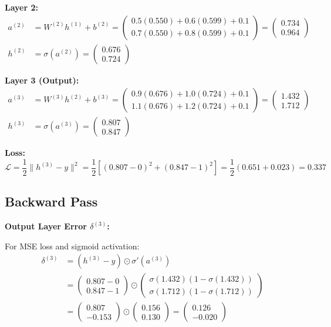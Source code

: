 \textbf{Layer 2:}
\begin{align}
a^{(2)} &= W^{(2)} h^{(1)} + b^{(2)} = \begin{pmatrix} 0.5(0.550) + 0.6(0.599) + 0.1 \\ 0.7(0.550) + 0.8(0.599) + 0.1 \end{pmatrix} = \begin{pmatrix} 0.734 \\ 0.964 \end{pmatrix} \\
h^{(2)} &= \sigma(a^{(2)}) = \begin{pmatrix} 0.676 \\ 0.724 \end{pmatrix}
\end{align}

\textbf{Layer 3 (Output):}
\begin{align}
a^{(3)} &= W^{(3)} h^{(2)} + b^{(3)} = \begin{pmatrix} 0.9(0.676) + 1.0(0.724) + 0.1 \\ 1.1(0.676) + 1.2(0.724) + 0.1 \end{pmatrix} = \begin{pmatrix} 1.432 \\ 1.712 \end{pmatrix} \\
h^{(3)} &= \sigma(a^{(3)}) = \begin{pmatrix} 0.807 \\ 0.847 \end{pmatrix}
\end{align}

\textbf{Loss:}
\[
\mathcal{L} = \frac{1}{2}\|h^{(3)} - y\|^2 = \frac{1}{2}\left[(0.807-0)^2 + (0.847-1)^2\right] = \frac{1}{2}(0.651 + 0.023) = 0.337
\]

\subsection{Backward Pass}

\textbf{Output Layer Error $\delta^{(3)}$:}

For MSE loss and sigmoid activation:
\begin{align}
\delta^{(3)} &= (h^{(3)} - y) \odot \sigma'(a^{(3)}) \\
&= \begin{pmatrix} 0.807 - 0 \\ 0.847 - 1 \end{pmatrix} \odot \begin{pmatrix} \sigma(1.432)(1-\sigma(1.432)) \\ \sigma(1.712)(1-\sigma(1.712)) \end{pmatrix} \\
&= \begin{pmatrix} 0.807 \\ -0.153 \end{pmatrix} \odot \begin{pmatrix} 0.156 \\ 0.130 \end{pmatrix} = \begin{pmatrix} 0.126 \\ -0.020 \end{pmatrix}
\end{align}

